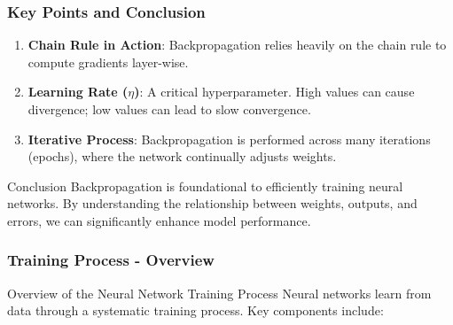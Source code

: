 \documentclass[aspectratio=169]{beamer}
\begin{document}
\begin{frame}[fragile]
  \frametitle{Key Points and Conclusion}
  \begin{enumerate}
    \item \textbf{Chain Rule in Action}: Backpropagation relies heavily on the chain rule to compute gradients layer-wise.
    
    \item \textbf{Learning Rate (\( \eta \))}: A critical hyperparameter. High values can cause divergence; low values can lead to slow convergence.
    
    \item \textbf{Iterative Process}: Backpropagation is performed across many iterations (epochs), where the network continually adjusts weights.
  \end{enumerate}

  \begin{block}{Conclusion}
    Backpropagation is foundational to efficiently training neural networks. By understanding the relationship between weights, outputs, and errors, we can significantly enhance model performance.
  \end{block}
\end{frame}

\begin{frame}[fragile]
    \frametitle{Training Process - Overview}
    \begin{block}{Overview of the Neural Network Training Process}
        Neural networks learn from data through a systematic training process. Key components include:
    \end{block}
\end{frame}
\end{document}
